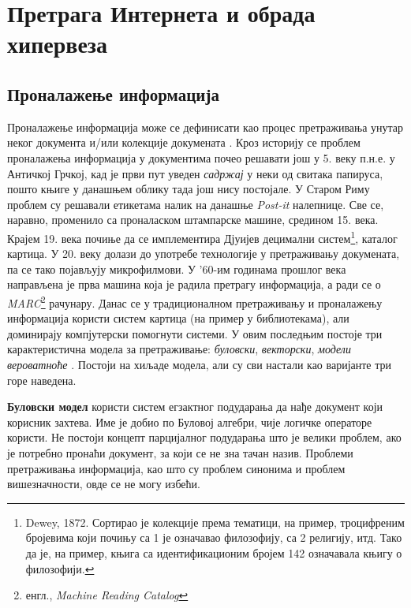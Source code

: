 \section{Претрага Интернета и обрада хипервеза}

\subsection{Проналажење информација}

Проналажење информација може се дефинисати као процес претраживања унутар неког документа и/или колекције докумената \cite{langville2011google}. Кроз историју се проблем проналажења информација у документима почео решавати још у 5. веку п.н.е. у Античкој Грчкој, кад је први пут уведен \emph{садржај} у неки од свитака папируса, пошто књиге у данашњем облику тада још нису постојале. У Старом Риму проблем су решавали етикетама налик на данашње \emph{Post-it} налепнице. Све се, наравно, променило са проналаском штампарске машине, средином 15. века. Крајем 19. века почиње да се имплементира Дјуијев децимални систем\footnote{Dewey, 1872. Сортирао је колекције према тематици, на пример, троцифреним бројевима који почињу са 1 је означавао филозофију, са 2 религију, итд. Тако да је, на пример, књига са идентификационим бројем 142 означавала књигу о филозофији.}, каталог картица. У 20. веку долази до употребе технологије у претраживању докумената, па се тако појављују микрофилмови. У '60-им годинама прошлог века направљена је прва машина која је радила претрагу информација, а ради се о \emph{MARC}\footnote{енгл., \emph{Machine Reading Catalog}} рачунару. Данас се у традиционалном претраживању и проналажењу информација користи систем картица (на пример у библиотекама), али доминирају компјутерски помогнути системи. У овим последњим постоје три карактеристична модела за претраживање: \emph{буловски}, \emph{векторски}, \emph{модели вероватноће} \cite[Ch 1.2]{langville2011google}. Постоји на хиљаде модела, али су сви настали као варијанте три горе наведена.

\textbf{Буловски модел} користи систем егзактног подударања да нађе документ који корисник захтева. Име је добио по Буловој алгебри, чије логичке операторе користи. Не постоји концепт парцијалног подударања што је велики проблем, ако је потребно пронаћи документ, за који се не зна тачан назив. Проблеми претраживања информација, као што су проблем синонима и проблем вишезначности, овде се не могу избећи.


